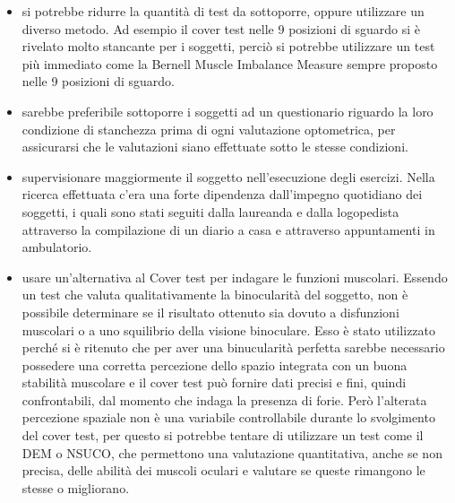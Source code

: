\begin{itemize}
\item si potrebbe ridurre la quantità di test da sottoporre, oppure utilizzare un diverso metodo. Ad esempio il cover test nelle 9 posizioni di sguardo si è rivelato molto stancante per i soggetti, perciò si potrebbe utilizzare un test più immediato come la Bernell Muscle Imbalance Measure sempre proposto nelle 9 posizioni di sguardo.
\item sarebbe preferibile sottoporre i soggetti ad un questionario riguardo la loro condizione di stanchezza prima di ogni valutazione optometrica, per assicurarsi che le valutazioni siano effettuate sotto le stesse condizioni.
\item supervisionare maggiormente il soggetto nell’esecuzione degli esercizi. Nella ricerca effettuata c’era una forte dipendenza dall’impegno quotidiano dei soggetti, i quali sono stati seguiti dalla laureanda e dalla logopedista attraverso la compilazione di un diario a casa e attraverso appuntamenti in ambulatorio.
\item usare un’alternativa al Cover test per indagare le funzioni muscolari. Essendo un test che valuta qualitativamente la binocularità del soggetto, non è possibile determinare se il risultato ottenuto sia dovuto a disfunzioni muscolari o a uno squilibrio della visione binoculare. Esso è stato utilizzato perché si è ritenuto che per aver una binucularità perfetta sarebbe necessario possedere una corretta percezione dello spazio integrata con un buona stabilità muscolare e il cover test può fornire dati precisi e fini, quindi confrontabili, dal momento che indaga la presenza di forie\cite{bib11}. Però l’alterata percezione spaziale non è una variabile controllabile durante lo svolgimento del cover test, per questo si potrebbe tentare di utilizzare un test come il DEM o NSUCO, che permettono una valutazione quantitativa, anche se non precisa, delle abilità dei muscoli oculari e valutare se queste rimangono le stesse o migliorano.
\end{itemize}
